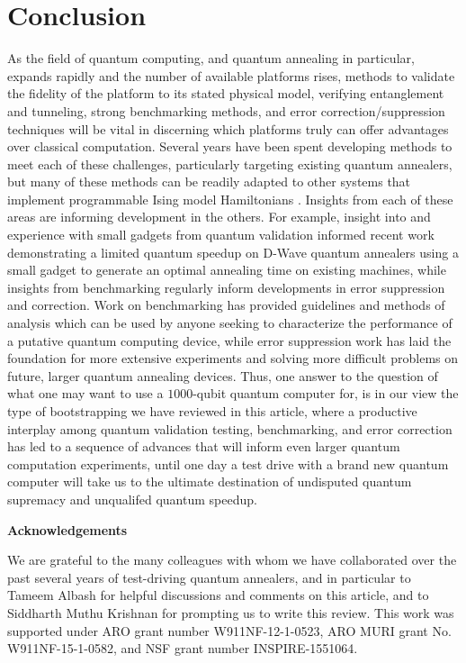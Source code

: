 \section{Conclusion}
As the field of quantum computing, and quantum annealing in particular, expands rapidly and the number of available platforms rises, methods to validate the fidelity of the platform to its stated physical model, verifying entanglement and tunneling, strong benchmarking methods, and error correction/suppression techniques will be vital in discerning which platforms truly can offer advantages over classical computation. Several years have been spent developing methods to meet each of these challenges, particularly targeting existing quantum annealers, but many of these methods can be readily adapted to other systems that implement programmable Ising model Hamiltonians \cite{Inagaki:2016aa}. Insights from each of these areas are informing development in the others. For example, insight into and experience with small gadgets from quantum validation informed recent work demonstrating a limited quantum speedup on D-Wave quantum annealers using a small gadget to generate an optimal annealing time on existing machines, while insights from benchmarking regularly inform developments in error suppression and correction. Work on benchmarking has provided guidelines and methods of analysis which can be used by anyone seeking to characterize the performance of a putative quantum computing device, while error suppression work has laid the foundation for more extensive experiments and solving more difficult problems on future, larger quantum annealing devices. Thus, one answer to the question of what one may want to use a $1000$-qubit quantum computer for, is in our view the type of bootstrapping we have reviewed in this article, where a productive interplay among quantum validation testing, benchmarking, and error correction has led to a sequence of advances that will inform even larger quantum computation experiments, until one day a test drive with a brand new quantum computer will take us to the ultimate destination of undisputed quantum supremacy and unqualifed quantum speedup.


\vspace{.8cm}

\textbf{Acknowledgements}

We are grateful to the many colleagues with whom we have collaborated over the past several years of test-driving quantum annealers, and in particular to Tameem Albash for helpful discussions and comments on this article, and to Siddharth Muthu Krishnan for prompting us to write this review. This work was supported under ARO grant number W911NF-12-1-0523, ARO MURI grant No. W911NF-15-1-0582, and NSF grant number INSPIRE-1551064.

